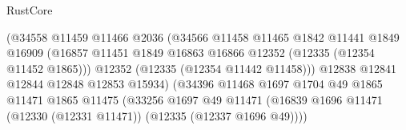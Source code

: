 \begin{lexlean}{RustCore}
\begin{coremodule}
                                                (@34558
                                                  @11459
                                                  @11466
                                                  @2036
                                                  (@34566
                                                    @11458
                                                    @11465
                                                    @1842
                                                    @11441
                                                    @1849
                                                    @16909
                                                    (@16857
                                                      @11451
                                                      @1849
                                                      @16863
                                                      @16866
                                                      @12352
                                                      (@12335 (@12354 @11452 @1865)))
                                                    @12352
                                                    (@12335 (@12354 @11442 @11458)))
                                                  @12838
                                                  @12841
                                                  @12844
                                                  @12848
                                                  @12853
                                                  @15934)
                                                (@34396
                                                  @11468
                                                  @1697
                                                  @1704
                                                  @49
                                                  @1865
                                                  @11471
                                                  @1865
                                                  @11475
                                                  (@33256
                                                    @1697
                                                    @49
                                                    @11471
                                                    (@16839
                                                      @1696
                                                      @11471
                                                      (@12330 (@12331 @11471))
                                                      (@12335 (@12337 @1696 @49))))

\end{coremodule}
\end{lexlean}
